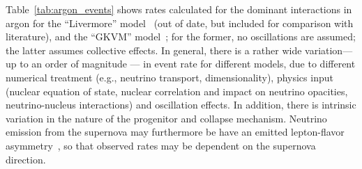 Table~\ref{tab:argon_events} shows rates calculated  for the dominant interactions in argon for
the ``Livermore'' model~\cite{Totani:1997vj} (out of date, but included for comparison with literature), and the ``GKVM''
model~\cite{Gava:2009pj}; for the former, no oscillations are assumed; the latter assumes collective effects.  In general, there is a rather wide variation--- up to an order of magnitude --- in event rate for different models, due to different numerical treatment (e.g., neutrino transport, dimensionality), physics input (nuclear equation of state, nuclear correlation and impact on neutrino opacities, neutrino-nucleus interactions) and oscillation effects. In addition, there is intrinsic variation in the nature of the progenitor and collapse mechanism.  Neutrino emission from the supernova may furthermore be have an emitted lepton-flavor asymmetry~\cite{Tamborra:2014aua}, so that observed rates may be dependent on the supernova direction.
%
\begin{table}[!htb]
  \caption[Event rates for different models in \SI{40}{\kt} of LAr for
    a core-collapse at 10~kpc]{Event rates for different
    supernova models in \SI{40}{\kt} of liquid argon for a core collapse at 10~kpc, for $\nu_e$ and $\bar{\nu}_e$ charged-current channels and elastic scattering (ES) on electrons.
    Event rates will simply scale by active detector mass and inverse square of supernova distance.   No oscillations are assumed; we note that oscillations (both standard and ``collective'') will potentially have a large, model-dependent effect.}
\label{tab:argon_events}\centering
{}
\end{table}


